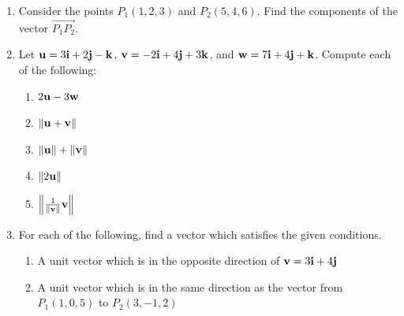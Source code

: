 \documentclass[12pt]{article}
\newif\ifans
\begin{document}
\begin{enumerate}
\item Consider the points $P_1(1,2,3)$ and $P_2(5,4,6)$.  Find the components of the vector $\overrightarrow{P_1P_2}$.

\ifans{\fbox{$\overrightarrow{P_1P_2}=\langle 4,2,3 \rangle$}} \fi

\item Let ${\bf u}= 3{\bf i}+2{\bf j}-{\bf k}$, ${\bf v}=-2{\bf i}+4{\bf j}+3{\bf k}$, and ${\bf w}=7{\bf i}+4{\bf j}+{\bf k}$.  Compute each of the following:

\begin{enumerate}

\item $2{\bf u}-3{\bf w}$

\ifans{\fbox{$-15{\bf i}-8{\bf j}-5{\bf k}$}} \fi

\item $\| {\bf u}+{\bf v}\|$

\ifans{\fbox{$\sqrt{41}$}} \fi

\item $\| {\bf u}\|+\|{\bf v}\|$

\ifans{\fbox{$\sqrt{14}+\sqrt{29}$}} \fi

\item $\|2{\bf u}\|$

\ifans{\fbox{$2\sqrt{14}$}} \fi

\item $\left\|\frac{1}{\|{\bf v}\|}{\bf v}\right\|$

\ifans{\fbox{1}} \fi

\end{enumerate}

\item For each of the following, find a vector which satisfies the given conditions.

\begin{enumerate}

\item A unit vector which is in the opposite direction of ${\bf v}=3{\bf i}+4{\bf j}$

\ifans{\fbox{$-\frac{3}{5}{\bf i}-\frac{4}{5}{\bf j}$; Detailed Solution: \textcolor{blue}{\href{http://www.math.drexel.edu/classes/Calculus/resources/Math200HW/Solutions/02_200_Vectors_07.pdf}{Here}}}} \fi

\item A unit vector which is in the same direction as the vector from $P_1(1,0,5)$ to $P_2(3,-1,2)$

\ifans{\fbox{$\left \langle \frac{2}{\sqrt{14}},-\frac{1}{\sqrt{14}},-\frac{3}{\sqrt{14}} \right \rangle$; Video Solution: \textcolor{blue}{\href{https://www.youtube.com/watch?v=DyOlo-QJJfI}{Here}}}} \fi


\end{enumerate}
\end{enumerate}
\end{document}
